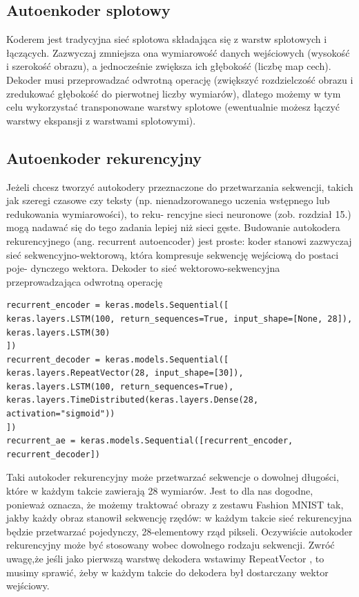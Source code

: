 \documentclass[12pt]{mwbk}
\theoremstyle{plain}
\theoremstyle{definition}
\theoremstyle{remark}
\begin{document}
\subsection{Autoenkoder splotowy}

\cite{geron}

Koderem jest tradycyjna sieć splotowa składająca się z warstw splotowych i łączących. Zazwyczaj zmniejsza ona wymiarowość danych wejściowych (wysokość i szerokość
obrazu), a jednocześnie zwiększa ich głębokość (liczbę map cech). Dekoder musi przeprowadzać
odwrotną operację (zwiększyć rozdzielczość obrazu i zredukować głębokość do pierwotnej liczby
wymiarów), dlatego możemy w tym celu wykorzystać transponowane warstwy splotowe (ewentualnie możesz łączyć warstwy ekspansji z warstwami splotowymi).


\subsection{Autoenkoder rekurencyjny}

\cite{geron}

Jeżeli chcesz tworzyć autokodery przeznaczone do przetwarzania sekwencji, takich jak szeregi czasowe
czy teksty (np. nienadzorowanego uczenia wstępnego lub redukowania wymiarowości), to reku-
rencyjne sieci neuronowe (zob. rozdział 15.) mogą nadawać się do tego zadania lepiej niż sieci gęste.
Budowanie autokodera rekurencyjnego (ang. recurrent autoencoder) jest proste: koder stanowi
zazwyczaj sieć sekwencyjno-wektorową, która kompresuje sekwencję wejściową do postaci poje-
dynczego wektora. Dekoder to sieć wektorowo-sekwencyjna przeprowadzająca odwrotną operację

\begin{verbatim}
recurrent_encoder = keras.models.Sequential([
keras.layers.LSTM(100, return_sequences=True, input_shape=[None, 28]),
keras.layers.LSTM(30)
])
recurrent_decoder = keras.models.Sequential([
keras.layers.RepeatVector(28, input_shape=[30]),
keras.layers.LSTM(100, return_sequences=True),
keras.layers.TimeDistributed(keras.layers.Dense(28, activation="sigmoid"))
])
recurrent_ae = keras.models.Sequential([recurrent_encoder, recurrent_decoder])
\end{verbatim}

Taki autokoder rekurencyjny może przetwarzać sekwencje o dowolnej długości, które w każdym
takcie zawierają 28 wymiarów. Jest to dla nas dogodne, ponieważ oznacza, że możemy traktować
obrazy z zestawu Fashion MNIST tak, jakby każdy obraz stanowił sekwencję rzędów: w każdym
takcie sieć rekurencyjna będzie przetwarzać pojedynczy, 28-elementowy rząd pikseli. Oczywiście
autokoder rekurencyjny może być stosowany wobec dowolnego rodzaju sekwencji. Zwróć uwagę,że jeśli jako pierwszą warstwę dekodera wstawimy RepeatVector , to musimy sprawić, żeby w każdym
takcie do dekodera był dostarczany wektor wejściowy.
\end{document}
